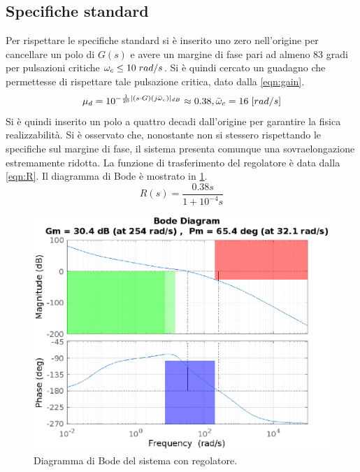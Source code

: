 \documentclass[a4paper]{article}
\begin{document}
\subsection{Specifiche standard}
Per rispettare le specifiche standard si è inserito uno zero nell'origine per cancellare un polo di $G(s)$ e avere un margine di fase pari ad almeno 83 gradi per pulsazioni critiche $\omega_c \le 10\hspace{0.3em} rad/s$.
Si è quindi cercato un guadagno che permettesse di rispettare tale pulsazione critica, dato dalla \cref{eqn:gain}.
\begin{equation}
\mu_d =  10^{-\frac{1}{20}|(s \cdot G)(j \bar{\omega}_c)|_{dB}} \approx 0.38, \bar{\omega}_c = 16 \hspace{0.3em} [rad/s]
\label{eqn:gain}
\end{equation}
Si è quindi inserito un polo a quattro decadi dall'origine per garantire la fisica realizzabilità.
Si è osservato che, nonostante non si stessero rispettando le specifiche sul margine di fase, il sistema presenta comunque una sovraelongazione estremamente ridotta.
La funzione di trasferimento del regolatore è data dalla \cref{eqn:R}.
Il diagramma di Bode è mostrato in \cref{fig:bode_L}.
\begin{equation}
    \label{eqn:R}
    R(s) = \frac{ 0.38 s}{ 1+  10^{-4} s}
\end{equation}

\begin{figure}[h!]
    \centering
    \includegraphics[width=\textwidth]{bode_L}
    \caption{Diagramma di Bode del sistema con regolatore.}
    \label{fig:bode_L}
\end{figure}
\end{document}
